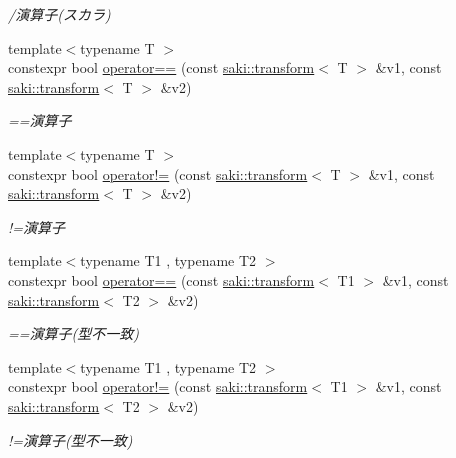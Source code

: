 \begin{DoxyCompactItemize}
\begin{DoxyCompactList}\small\item\em /演算子(スカラ) \end{DoxyCompactList}\item 
{\footnotesize template$<$typename T $>$ }\\constexpr bool \mbox{\hyperlink{namespacesaki_a57a23952c9becf92a51ff1742f645d66}{operator==}} (const \mbox{\hyperlink{classsaki_1_1transform}{saki\+::transform}}$<$ T $>$ \&v1, const \mbox{\hyperlink{classsaki_1_1transform}{saki\+::transform}}$<$ T $>$ \&v2)
\begin{DoxyCompactList}\small\item\em ==演算子 \end{DoxyCompactList}\item 
{\footnotesize template$<$typename T $>$ }\\constexpr bool \mbox{\hyperlink{namespacesaki_af91b2b2e47f5556c7604281af5223247}{operator!=}} (const \mbox{\hyperlink{classsaki_1_1transform}{saki\+::transform}}$<$ T $>$ \&v1, const \mbox{\hyperlink{classsaki_1_1transform}{saki\+::transform}}$<$ T $>$ \&v2)
\begin{DoxyCompactList}\small\item\em !=演算子 \end{DoxyCompactList}\item 
{\footnotesize template$<$typename T1 , typename T2 $>$ }\\constexpr bool \mbox{\hyperlink{namespacesaki_afde7d962261485c2054cd1a98ed337ed}{operator==}} (const \mbox{\hyperlink{classsaki_1_1transform}{saki\+::transform}}$<$ T1 $>$ \&v1, const \mbox{\hyperlink{classsaki_1_1transform}{saki\+::transform}}$<$ T2 $>$ \&v2)
\begin{DoxyCompactList}\small\item\em ==演算子(型不一致) \end{DoxyCompactList}\item 
{\footnotesize template$<$typename T1 , typename T2 $>$ }\\constexpr bool \mbox{\hyperlink{namespacesaki_a8c33f5cbcafab48779b77c324716fed9}{operator!=}} (const \mbox{\hyperlink{classsaki_1_1transform}{saki\+::transform}}$<$ T1 $>$ \&v1, const \mbox{\hyperlink{classsaki_1_1transform}{saki\+::transform}}$<$ T2 $>$ \&v2)
\begin{DoxyCompactList}\small\item\em !=演算子(型不一致) \end{DoxyCompactList}\item 

\end{DoxyCompactItemize}
